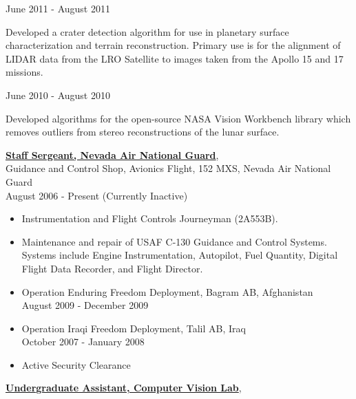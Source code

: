 \documentclass[10pt]{article}
\newenvironment{outerlist}[1][\enskip\textbullet]%
        {\begin{itemize}[#1]}{\end{itemize}%
         \vspace{-.6\baselineskip}}
\newenvironment{innerlist}[1][\enskip\textbullet]%
        {\begin{compactitem}[#1]}{\end{compactitem}}
\begin{document}
      \begin{outerlist}
      \item June 2011 - August 2011
         \begin{innerlist}
         \item[] Developed a crater detection algorithm for use in planetary
               surface characterization and terrain reconstruction. Primary use
               is for the alignment of LIDAR data from the LRO Satellite
               to images taken from the Apollo 15 and 17 missions.
         \end{innerlist}
      
      \item June 2010 - August 2010
      \begin{innerlist}
      \item[] Developed algorithms for the open-source NASA Vision Workbench library
            which removes outliers from stereo reconstructions of the lunar surface.\\
      \end{innerlist}
      \end{outerlist}
\href{http://www.nv.ngb.army.mil/air/index.cfm}
     {\textbf{Staff Sergeant, Nevada Air National Guard}},\\
     Guidance and Control Shop, Avionics Flight, 152 MXS, Nevada Air National Guard\\
     August 2006 - Present (Currently Inactive)
     \begin{outerlist}
     \item Instrumentation and Flight Controls Journeyman (2A553B).
     \item Maintenance and repair of USAF C-130 Guidance and Control Systems. Systems
           include Engine Instrumentation, Autopilot, Fuel Quantity,
           Digital Flight Data Recorder, and Flight Director.
     \item Operation Enduring Freedom Deployment, Bagram AB, Afghanistan\\     
           August 2009 - December 2009
     \item Operation Iraqi Freedom Deployment, Talil AB, Iraq\\               
           October 2007 - January 2008
     \item Active Security Clearance\\
     \end{outerlist}
\href{http://www.cse.unr.edu/CVL/}
     {\textbf{Undergraduate Assistant, Computer Vision Lab}},\\
\end{document}
